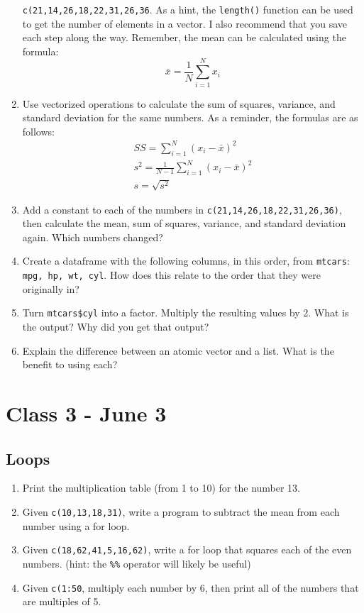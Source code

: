 \documentclass[letterpaper,12pt]{article}
\begin{document}
\begin{enumerate}
    \verb|c(21,14,26,18,22,31,26,36|. As a hint, the \verb|length()| function can be used to get the number of elements in a vector. I also recommend that you save each step along the way. Remember, the mean can be calculated using the formula:
    \begin{equation*}
        \bar{x} = \frac{1}{N}\sum_{i=1}^N x_i
    \end{equation*}
    \item Use vectorized operations to calculate the sum of squares, variance, and standard deviation for the same numbers. As a reminder, the formulas are as follows:
    \begin{gather*}
        SS = \sum_{i=1}^N (x_i - \bar{x})^2 \\
        s^2 = \frac{1}{N-1}\sum_{i=1}^N (x_i - \bar{x})^2 \\
        s = \sqrt{s^2}
    \end{gather*}
    \item Add a constant to each of the numbers in \verb|c(21,14,26,18,22,31,26,36)|, then calculate the mean, sum of squares, variance, and standard deviation again. Which numbers changed?
    \item Create a dataframe with the following columns, in this order, from \verb|mtcars|: \verb|mpg, hp, wt, cyl|. How does this relate to the order that they were originally in?
    \item Turn \verb|mtcars$cyl| into a factor. Multiply the resulting values by 2. What is the output? Why did you get that output?
    \item Explain the difference between an atomic vector and a list. What is the benefit to using each?
\end{enumerate}

\section{Class 3 - June 3}

\subsection{Loops}

\begin{enumerate}
    \item Print the multiplication table (from 1 to 10) for the number 13.
    \item Given \verb|c(10,13,18,31)|, write a program to subtract the mean from each number using a for loop. 
    \item Given \verb|c(18,62,41,5,16,62)|, write a for loop that squares each of the even numbers. (hint: the \verb|%%| operator will likely be useful)
    \item Given \verb|c(1:50|, multiply each number by 6, then print all of the numbers that are multiples of 5.
\end{enumerate}
\end{document}
